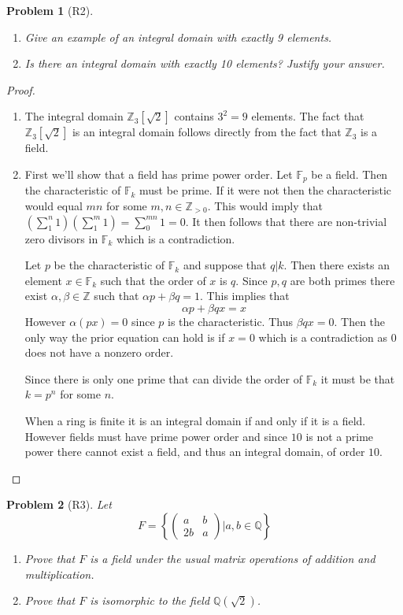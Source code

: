 \documentclass[10pt]{article}
\newcommand{\sk}{\vskip 10mm}
\newcommand{\bb}[1]{\mathbb{#1}}
\theoremstyle{plain}
\newtheorem{problem}{Problem}
\theoremstyle{remark}
\begin{document}
\sk

\begin{problem}[R2]
  \begin{enumerate}
  \item Give an example of an integral domain with exactly 9 elements.
  \item Is there an integral domain with exactly 10 elements? Justify
    your answer.
  \end{enumerate}
\end{problem}

\begin{proof}
  \begin{enumerate}
  \item The integral domain $\bb{Z}_3[\sqrt{2}]$ contains $3^2=9$ elements.
    The fact that $\bb{Z}_3[\sqrt{2}]$ is an integral domain follows directly
    from the fact that $\bb{Z}_3$ is a field.
  \item First we'll show that a field has prime power order. Let $\bb{F}_p$ be
    a field. Then the characteristic of $\bb{F}_k$ must be prime. If it were
    not then the characteristic would equal $mn$ for some $m,n\in\bb{Z}_{>0}$.
    This would imply that $(\sum_1^n1)(\sum_1^m1)=\sum_0^{mn}1=0$. It then follows that
    there are non-trivial zero divisors in $\bb{F}_k$ which is a contradiction.

    Let $p$ be the characteristic of $\bb{F}_k$ and suppose that $q|k$. Then
    there exists an element $x\in\bb{F}_k$ such that the order of $x$ is $q$.
    Since $p,q$ are both primes there exist $\alpha,\beta\in\bb{Z}$  such that
    $\alpha p+\beta q =1$. This implies that
    \[ \alpha p + \beta q x = x\]
    However $\alpha (px)=0$ since $p$ is the characteristic. Thus $\beta q x =0$. Then
    the only way the prior equation can hold is if $x=0$ which is a contradiction
    as $0$ does not have a nonzero order.

    Since there is only one prime that can divide the order of $\bb{F}_k$
    it must be that $k=p^n$ for some $n$.

    When a ring is finite it is an integral domain if and only if it is
    a field. However fields must have prime power order and since $10$ is not
    a prime power there cannot exist a field, and thus an integral domain, of
    order $10$.
  \end{enumerate}
\end{proof}

\sk

\begin{problem}[R3]
  Let
  \[
    F =
    \left\{\left(
        \begin{array}{cc}
          a&b\\
          2b&a
        \end{array}
      \right)| a,b\in \bb{Q}\right\}
  \]
  \begin{enumerate}
  \item Prove that $F$ is a field under the usual matrix operations of addition
    and multiplication.
  \item Prove that $F$ is isomorphic to the field $\bb{Q}(\sqrt{2})$.
  \end{enumerate}
\end{problem}
\end{document}
